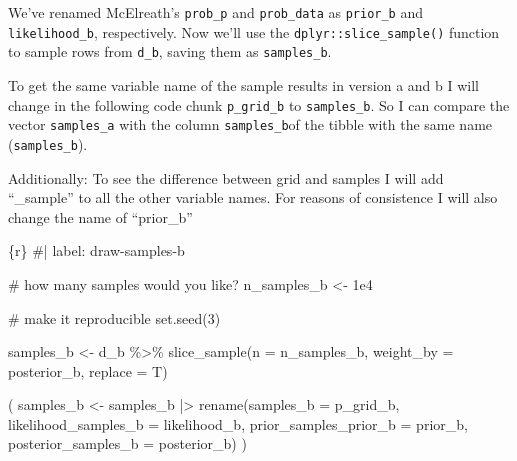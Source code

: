 \documentclass[
  letterpaper,
  DIV=11,
  numbers=noendperiod]{scrreprt}
\newenvironment{Shaded}{\begin{snugshade}}{\end{snugshade}}
\newcommand{\AttributeTok}[1]{\textcolor[rgb]{0.40,0.45,0.13}{#1}}
\newcommand{\CommentTok}[1]{\textcolor[rgb]{0.37,0.37,0.37}{#1}}
\newcommand{\DecValTok}[1]{\textcolor[rgb]{0.68,0.00,0.00}{#1}}
\newcommand{\FloatTok}[1]{\textcolor[rgb]{0.68,0.00,0.00}{#1}}
\newcommand{\FunctionTok}[1]{\textcolor[rgb]{0.28,0.35,0.67}{#1}}
\newcommand{\InformationTok}[1]{\textcolor[rgb]{0.37,0.37,0.37}{#1}}
\newcommand{\NormalTok}[1]{\textcolor[rgb]{0.00,0.23,0.31}{#1}}
\newcommand{\OtherTok}[1]{\textcolor[rgb]{0.00,0.23,0.31}{#1}}
\newcommand{\SpecialCharTok}[1]{\textcolor[rgb]{0.37,0.37,0.37}{#1}}
\begin{document}
\begin{tcolorbox}[enhanced jigsaw, colframe=quarto-callout-caution-color-frame, colback=white, toprule=.15mm, breakable, arc=.35mm, bottomtitle=1mm, colbacktitle=quarto-callout-caution-color!10!white, toptitle=1mm, titlerule=0mm, title=\textcolor{quarto-callout-caution-color}{\faFire}\hspace{0.5em}{Changing variable names}, leftrule=.75mm, opacityback=0, rightrule=.15mm, opacitybacktitle=0.6, bottomrule=.15mm, left=2mm, coltitle=black]

We've renamed McElreath's \texttt{prob\_p} and \texttt{prob\_data} as
\texttt{prior\_b} and \texttt{likelihood\_b}, respectively. Now we'll
use the \texttt{dplyr::slice\_sample()} function to sample rows from
\texttt{d\_b}, saving them as \texttt{samples\_b}.

To get the same variable name of the sample results in version a and b I
will change in the following code chunk \texttt{p\_grid\_b} to
\texttt{samples\_b}. So I can compare the vector \texttt{samples\_a}
with the column \texttt{samples\_b}of the tibble with the same name
(\texttt{samples\_b}).

Additionally: To see the difference between grid and samples I will add
``\_sample'' to all the other variable names. For reasons of consistence
I will also change the name of ``prior\_b''

\end{tcolorbox}

\begin{Shaded}
\begin{Highlighting}[]
\InformationTok{\textasciigrave{}\textasciigrave{}\textasciigrave{}\{r\}}
\CommentTok{\#| label: draw{-}samples{-}b}

\CommentTok{\# how many samples would you like?}
\NormalTok{n\_samples\_b }\OtherTok{\textless{}{-}} \FloatTok{1e4}

\CommentTok{\# make it reproducible}
\FunctionTok{set.seed}\NormalTok{(}\DecValTok{3}\NormalTok{)}

\NormalTok{samples\_b }\OtherTok{\textless{}{-}}
\NormalTok{  d\_b }\SpecialCharTok{\%\textgreater{}\%} 
    \FunctionTok{slice\_sample}\NormalTok{(}\AttributeTok{n =}\NormalTok{ n\_samples\_b, }\AttributeTok{weight\_by =}\NormalTok{ posterior\_b, }\AttributeTok{replace =}\NormalTok{ T)}


\NormalTok{( }
\NormalTok{    samples\_b }\OtherTok{\textless{}{-}}\NormalTok{ samples\_b }\SpecialCharTok{|\textgreater{}}
        \FunctionTok{rename}\NormalTok{(}\AttributeTok{samples\_b =}\NormalTok{ p\_grid\_b,}
               \AttributeTok{likelihood\_samples\_b =}\NormalTok{ likelihood\_b,}
               \AttributeTok{prior\_samples\_prior\_b =}\NormalTok{ prior\_b,}
               \AttributeTok{posterior\_samples\_b =}\NormalTok{ posterior\_b)}
\NormalTok{)}
\InformationTok{\textasciigrave{}\textasciigrave{}\textasciigrave{}}
\end{Highlighting}
\end{Shaded}
\end{document}
